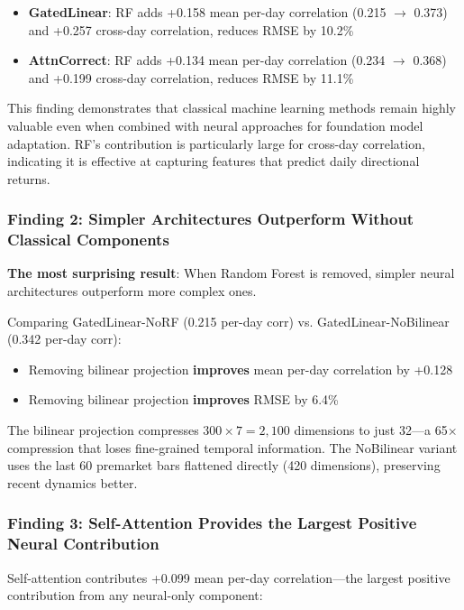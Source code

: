 \documentclass[10pt,conference]{IEEEtran}
\newcommand{\rev}[1]{#1}
\begin{document}
\begin{itemize}
    \item \textbf{GatedLinear}: RF adds \rev{+0.158 mean per-day correlation (0.215 $\to$ 0.373) and +0.257 cross-day correlation}, reduces RMSE by \rev{10.2}\%
    \item \textbf{AttnCorrect}: RF adds \rev{+0.134 mean per-day correlation (0.234 $\to$ 0.368) and +0.199 cross-day correlation}, reduces RMSE by \rev{11.1}\%
\end{itemize}

This finding demonstrates that classical machine learning methods remain highly valuable even when combined with neural approaches for foundation model adaptation. \rev{RF's contribution is particularly large for cross-day correlation, indicating it is effective at capturing features that predict daily directional returns.}

\subsubsection{Finding 2: Simpler Architectures Outperform Without Classical Components}

\textbf{The most surprising result}: When Random Forest is removed, simpler neural architectures outperform more complex ones.

Comparing GatedLinear-NoRF (\rev{0.215} \rev{per-day} corr) vs. GatedLinear-NoBilinear (\rev{0.342} \rev{per-day} corr):
\begin{itemize}
    \item Removing bilinear projection \textbf{improves} \rev{mean per-day} correlation by \rev{+0.128}
    \item Removing bilinear projection \textbf{improves} RMSE by \rev{6.4}\%
\end{itemize}

The bilinear projection compresses $300 \times 7 = 2,100$ dimensions to just 32---a 65$\times$ compression that loses fine-grained temporal information. The NoBilinear variant uses the last 60 premarket bars flattened directly (420 dimensions), preserving recent dynamics better.

\subsubsection{Finding 3: Self-Attention Provides \rev{the} Largest \rev{Positive} Neural Contribution}

Self-attention contributes \rev{+0.099 mean per-day} correlation---the largest \rev{positive} contribution from any \rev{neural-only} component:
\end{document}
